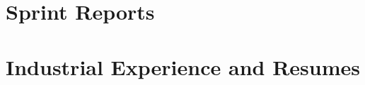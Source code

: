 \documentclass{book}
\begin{document}
\appendix

%

%

\chapter{Sprint Reports}


\chapter{Industrial Experience and Resumes}



%

\backmatter
\end{document}
